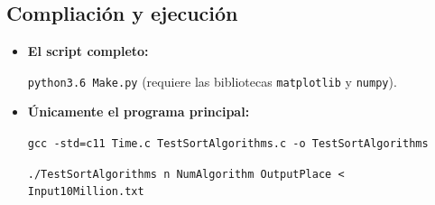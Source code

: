 \documentclass[12pt, fleqn]{report}                             %
\theoremstyle{break}                                            %
\begin{document}
\begin{appendices}
	    \section{Compliación y ejecución}
	        \begin{itemize}\setlength\itemsep{0em}
	            \item \textbf{El script completo:}
	            
	                \texttt{python3.6 Make.py} (requiere las bibliotecas \texttt{matplotlib} y \texttt{numpy}).
	                
	            \item \textbf{Únicamente el programa principal:}
	            
	                \texttt{gcc -std=c11 Time.c TestSortAlgorithms.c -o TestSortAlgorithms}
	                
	                \texttt{./TestSortAlgorithms n NumAlgorithm OutputPlace < Input10Million.txt}
	        \end{itemize}
	        
	\end{appendices}
	
    
	
\end{document}
